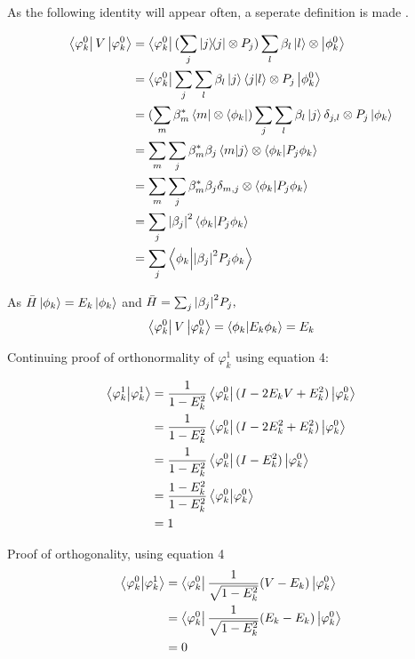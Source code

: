 As the following identity will appear often, a seperate definition is made .

\begin{align} \begin{split}
\left\langle{\varphi_k^0}\right\vert V \left\vert{\varphi_k^0}\right\rangle &= \left\langle{\varphi_k^0}\right\vert (\sum_j | j \rangle\!\langle j | \otimes P_j) \sum_l \beta_l \left\vert{l}\right\rangle \otimes \left\vert{\phi_k^0}\right\rangle\\
&= \left\langle{\varphi_k^0}\right\vert\sum_j \sum_l \beta_l \left\vert{j}\right\rangle \braket{j}{l} \otimes P_j \left\vert{\phi_k^0}\right\rangle\\
&=(\sum_m \beta_m^* \left\langle{m}\right\vert \otimes \left\langle{\phi_k}\right\vert) \sum_j \sum_l \beta_l \left\vert{j}\right\rangle \delta_{j,l} \otimes P_j \left\vert{\phi_k}\right\rangle\\
&= \sum_m \sum_j \beta_m^* \beta_j \braket{m}{j} \otimes \braket{\phi_k}{P_j \phi_k}\\
&= \sum_m \sum_j \beta_m^* \beta_j \delta_{m,j} \otimes \braket{\phi_k}{P_j \phi_k}\\
&= \sum_j \abs{\beta_j}^2 \braket{\phi_k}{P_j \phi_k}\\
&= \sum_j \braket{\phi_k}{ \abs{\beta_j}^2  P_j \phi_k}
\end{split} \end{align}

As $\bar{H}\left\vert{\phi_k}\right\rangle = E_k\left\vert{\phi_k}\right\rangle$ and $\bar{H} = \sum_j \abs{\beta_j}^2  P_j,$
\begin{equation} \label{0V0}
\left\langle{\varphi_k^0}\right\vert V \left\vert{\varphi_k^0}\right\rangle = \braket{\phi_k}{E_k \phi_k}
= E_k
\end{equation}

Continuing proof of orthonormality of $\varphi_k^1$ using equation 4:



\begin{align} \begin{split}
\braket{\varphi_k^1}{\varphi_k^1} &= \frac{1}{1 - E^2_k} \left\langle{\varphi_k^0}\right\vert (I - 2 E_kV + E_k^2) \left\vert{\varphi_k^0}\right\rangle\\
&= \frac{1}{1 - E^2_k} \left\langle{\varphi_k^0}\right\vert (I - 2 E_k^2 + E_k^2) \left\vert{\varphi_k^0}\right\rangle\\
&= \frac{1}{1 - E^2_k} \left\langle{\varphi_k^0}\right\vert (I -  E_k^2) \left\vert{\varphi_k^0}\right\rangle\\
&= \frac{1- E^2_k}{1 - E^2_k} \braket{\varphi_k^0}{\varphi_k^0}\\
&= 1
\end{split} \end{align}

Proof of orthogonality, using equation 4
\begin{align} \begin{split}
\braket{\varphi_k^0}{\varphi_k^1} &= \left\langle{\varphi_k^0}\right\vert  \frac{1}{\sqrt{1 - E^2_k}}(V-E_k) \left\vert{\varphi_k^0}\right\rangle\\
&= \left\langle{\varphi_k^0}\right\vert  \frac{1}{\sqrt{1 - E^2_k}}(E_k-E_k) \left\vert{\varphi_k^0}\right\rangle\\
&= 0
\end{split} \end{align}

